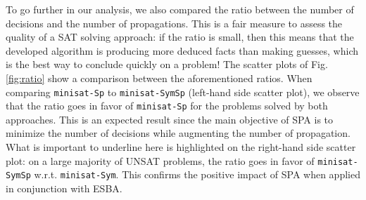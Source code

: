 To go further in our analysis, we also compared the ratio between the number of
decisions and the number of propagations. This is a fair measure to assess the
quality of a SAT solving approach: if the ratio is small, then this means that
the developed algorithm is producing more deduced facts than making guesses,
which is the best way to conclude quickly on a problem!
The scatter plots of Fig.\ref{fig:ratio} show a comparison between the
aforementioned ratios. When comparing \texttt{minisat-Sp} to
\texttt{minisat-SymSp} (left-hand side scatter plot), we observe that the
ratio goes in favor of \texttt{minisat-Sp} for the problems solved by both
approaches. This is an expected result since the main objective of SPA is to
minimize the number of decisions while augmenting the number of propagation.
What is important to underline here is highlighted on the right-hand side
scatter plot: on a large majority of UNSAT problems, the ratio goes in favor
of \texttt{minisat-SymSp} w.r.t. \texttt{minisat-Sym}. This confirms the
positive impact of SPA when applied in conjunction with ESBA.
%
%
%
% 
